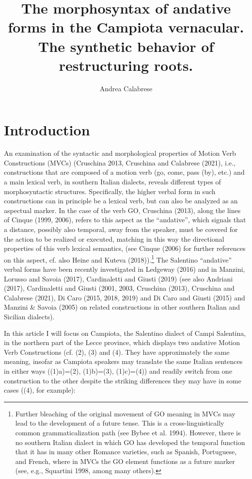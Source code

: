 \documentclass[output=paper,colorlinks,citecolor=brown,
]{langscibook}
\author{Andrea Calabrese}
\title{The morphosyntax of andative forms in the Campiota vernacular.
The synthetic behavior of restructuring roots.}
\begin{document}
\maketitle

\section{Introduction}


An examination of the syntactic and morphological properties of Motion Verb Constructions (MVCs) (Cruschina 2013, Cruschina and Calabrese (2021), i.e., constructions that are composed of a motion verb (go, come, pass (by), etc.) and a main lexical verb, in southern Italian dialects, reveals different types of morphosyntactic structures. Specifically, the higher verbal form in such constructions can in principle be a lexical verb, but can also be analyzed as an aspectual marker. In the case of the verb GO, Cruschina (2013), along the lines of Cinque (1999, 2006), refers to this aspect as the “andative”, which signals that a distance, possibly also temporal, away from the speaker, must be covered for the action to be realized or executed, matching in this way the directional properties of this verb lexical semantics, (see Cinque (2006) for further references on this aspect, cf. also Heine and Kuteva (2018)).\footnote{Further bleaching of the original movement of GO meaning in MVCs  may lead to the development of a future tense. This is a cross-linguistically common grammaticalization path (see Bybee et al. 1994). However, there is no southern Italian dialect in which GO has developed the temporal function that it has in many other Romance varieties, such as Spanish, Portuguese, and French, where in MVCs the GO element functions as a future marker (see, e.g., Squartini 1998, among many others). }   The Salentino “andative” verbal forms have been recently investigated in Ledgeway (2016) and in Manzini, Lorusso and Savoia (2017), Cardinaletti  and Giusti (2019) (see also Andriani (2017), Cardinaletti  and Giusti (2001, 2003, Cruschina (2013), Cruschina and Calabrese (2021), Di Caro (2015, 2018, 2019) and Di Caro and Giusti (2015) and Manzini \& Savoia (2005) on related constructions in other southern Italian and Sicilian dialects). 

In this article I will focus on Campiota, the Salentino dialect of Campi Salentina, in the northern part of the Lecce province, which displays two andative Motion Verb Constructions (cf. (2), (3) and (4). They have approximately the same meaning, insofar as Campiota speakers may translate the same Italian sentences in either ways ((1)a)=(2), (1)b)=(3), (1)c)=(4)) and readily switch from one construction to the other despite the striking differences they may have in some cases ((4), for example):
\end{document}
